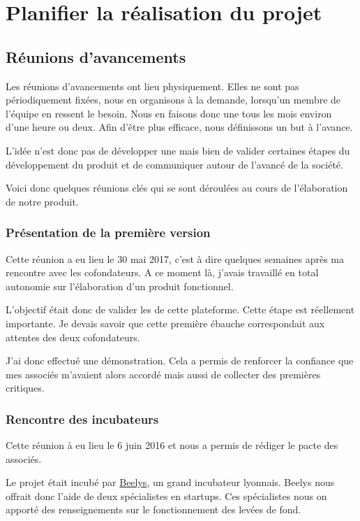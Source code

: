 \documentclass[]{report}
\begin{document}
\chapter{Planifier la réalisation du projet}

  \section{Réunions d'avancements}

    Les réunions d'avancements ont lieu physiquement. Elles ne sont pas périodiquement fixées, nous en organisons à la demande, lorsqu'un membre de l'équipe en ressent le besoin. Nous en faisons donc une tous les mois environ d'une heure ou deux. Afin d'être plus efficace, nous définissons un but à l'avance.

    L'idée n'est donc pas de développer une  mais bien de valider certaines étapes du développement du produit et de communiquer autour de l'avancé de la société.

    Voici donc quelques réunions clés qui se sont déroulées au cours de l'élaboration de notre produit.

    \subsection{Présentation de la première version}

      Cette réunion a eu lieu le 30 mai 2017, c'est à dire quelques semaines après ma rencontre avec les cofondateurs. A ce moment là, j'avais travaillé en total autonomie sur l'élaboration d'un produit fonctionnel.

      L'objectif était donc de valider les  de cette plateforme. Cette étape est réellement importante. Je devais savoir que cette première ébauche correspondait aux attentes des deux cofondateurs.

      J'ai donc effectué une démonstration. Cela a permis de renforcer la confiance que mes associés m'avaient alors accordé mais aussi de collecter des premières critiques.

    \subsection{Rencontre des incubateurs}

      Cette réunion à eu lieu le 6 juin 2016 et nous a permis de rédiger le pacte des associés.

      Le projet était incubé par \href{https://www.beelys.org/}{Beelys}, un grand incubateur lyonnais. Beelys nous offrait donc l'aide de deux spécialistes en startups. Ces spécialistes nous on apporté des renseignements sur le fonctionnement des levées de fond.
\end{document}
